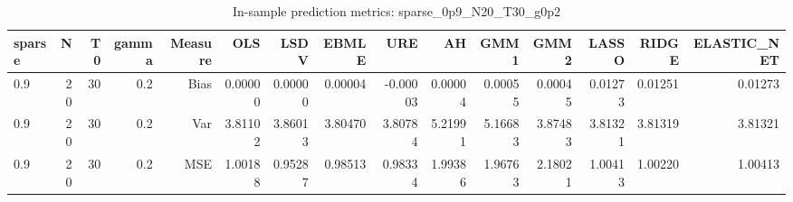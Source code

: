 \begin{table}[!htbp]\centering
\caption{In-sample prediction metrics: sparse_0p9_N20_T30_g0p2}
\label{tab:table2_sparse_0p9_N20_T30_g0p2}
\begin{tabular}{lrrrrrrrrrrrrrr}
\hline
sparse & N & T0 & gamma & Measure & OLS & LSDV & EBMLE & URE & AH & GMM1 & GMM2 & LASSO & RIDGE & ELASTIC_NET \\
\hline
0.9 & 20 & 30 & 0.2 & Bias & 0.00000 & 0.00000 & 0.00004 & -0.00003 & 0.00004 & 0.00055 & 0.00045 & 0.01273 & 0.01251 & 0.01273 \\
0.9 & 20 & 30 & 0.2 & Var & 3.81102 & 3.86013 & 3.80470 & 3.80784 & 5.21991 & 5.16683 & 3.87483 & 3.81321 & 3.81319 & 3.81321 \\
0.9 & 20 & 30 & 0.2 & MSE & 1.00188 & 0.95287 & 0.98513 & 0.98334 & 1.99386 & 1.96763 & 2.18021 & 1.00413 & 1.00220 & 1.00413 \\
\hline
\end{tabular}
\end{table}


